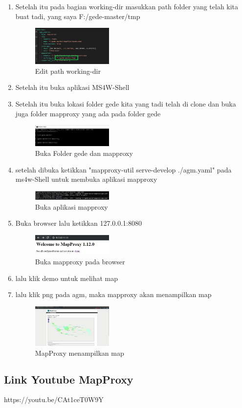\begin{enumerate}
  \item Setelah itu pada bagian working-dir masukkan path folder yang telah kita buat tadi, yang saya F:/gede-master/tmp
  \hfill\break
  \begin{figure}[H]
  \includegraphics[width=4cm]{figures/tugas4/1174054/29.png}
  \centering
  \caption{Edit path working-dir}
  \end{figure}

  \item Setelah itu buka aplikasi MS4W-Shell

  \item Setelah itu buka lokasi folder gede kita yang tadi telah di clone dan buka juga folder mapproxy yang ada pada folder gede
  \hfill\break
  \begin{figure}[H]
  \includegraphics[width=4cm]{figures/tugas4/1174054/30.png}
  \centering
  \caption{Buka Folder gede dan mapproxy}
  \end{figure}

  \item setelah dibuka ketikkan "mapproxy-util serve-develop ./agm.yaml" pada ms4w-Shell untuk membuka aplikasi mapproxy
  \hfill\break
  \begin{figure}[H]
  \includegraphics[width=4cm]{figures/tugas4/1174054/31.png}
  \centering
  \caption{Buka aplikasi mapproxy}
  \end{figure}
  
  \item Buka browser lalu ketikkan 127.0.0.1:8080
  \hfill\break
  \begin{figure}[H]
  \includegraphics[width=4cm]{figures/tugas4/1174054/32.png}
  \centering
  \caption{Buka mapproxy pada browser}
  \end{figure}

  \item lalu klik demo untuk melihat map
  \item lalu klik png pada agm, maka mapproxy akan menampilkan map
  \hfill\break
  \begin{figure}[H]
  \includegraphics[width=4cm]{figures/tugas4/1174054/33.png}
  \centering
  \caption{MapProxy menampilkan map}
  \end{figure}

\end{enumerate}
\subsection{Link Youtube MapProxy}
https://youtu.be/CAt1ceT0W9Y
